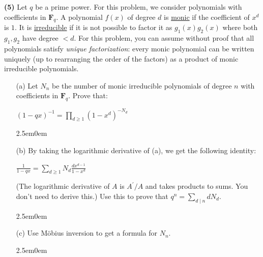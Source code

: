 \documentclass{book}
\newcommand{\exOne}{%
   \color{Purple}%
   \fontsize{13}{15}\selectfont%
}
\newenvironment{myIndent}{%
   \begin{adjustwidth}{2.5em}{0em}%
}{%
   \end{adjustwidth}%
}
\newcommand{\udefine}[1]{{%
   \setulcolor{Red}%
   \setul{0.14em}{0.07em}%
   \ul{#1}%
}}
\newcommand{\blab}[1]{\textbf{#1}}
\newcommand{\divides}{\mathop{\mid}}
\newcommand{\retTwo}{\hfill\bigbreak}
\begin{document}
\blab{(5)} Let $q$ be a prime power. For this problem, we consider polynomials with\\ coefficients in $\bm{F}_q$. A polynomial $f(x)$ of degree $d$ is \udefine{monic} if the coefficient of $x^d$ is $1$. It is \udefine{irreducible} if it is not possible to factor it as $g_1(x)g_2(x)$ where both $g_1, g_2$ have degree $< d$. For this problem, you can assume without proof that all polynomials satisfy \textit{unique factorization}: every monic polynomial can be written uniquely (up to rearranging the order of the factors) as a product of monic irreducible polynomials.

\begin{enumerate}
	\item[(a)] Let $N_n$ be the number of monic irreducible polynomials of degree $n$ with\\ coefficients in $\bm{F}_q$. Prove that:
	
	{\centering $(1 - qx)^{-1} = \prod\limits_{d \geq 1}(1 - x^d)^{-N_d}$ \retTwo\par}

	\begin{myIndent}\exOne
	
		\retTwo
	\end{myIndent}

	\item[(b)] By taking the logarithmic derivative of (a), we get the following identity:
	
	{\centering $\frac{1}{1 -qx} = \sum\limits_{d \geq 1}N_d\frac{dx^{d-1}}{1 - x^d}$ \retTwo\par}

	(The logarithmic derivative of $A$ is $A^\prime / A$ and takes products to sums. You don't need to derive this.) Use this to prove that $q^n = \sum\limits_{d \divides n}dN_d$.

	\begin{myIndent}\exOne
	
		\retTwo
	\end{myIndent}

	\item[(c)] Use Möbius inversion to get a formula for $N_n$.
	
	\begin{myIndent}\exOne
	
		\retTwo
	\end{myIndent}
\end{enumerate}
\end{document}
